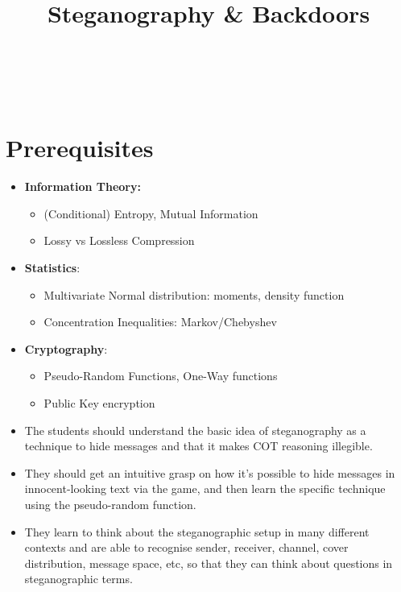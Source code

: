 \documentclass[11pt]{article}
\title{Steganography \& Backdoors}
\author{
  \authorname{Stephan Wäldchen}\\
  \affiliation{Independent}
  \and
  \authorname{Louis Jaburi}\\
  \affiliation{EleutherAI}
}
\date{}
\begin{document}
\maketitle

\section{Prerequisites}
\label{sec:prereqs}

\begin{itemize}
  \item \textbf{Information Theory:}
  \begin{itemize}
    \item (Conditional) Entropy, Mutual Information
    \item Lossy vs Lossless Compression
  \end{itemize}
  \item \textbf{Statistics}:
  \begin{itemize}
    \item Multivariate Normal distribution: moments, density function
    \item Concentration Inequalities: Markov/Chebyshev
  \end{itemize}
  \item \textbf{Cryptography}:
  \begin{itemize}
    \item Pseudo-Random Functions, One-Way functions
    \item Public Key encryption
  \end{itemize}
\end{itemize}

\begin{learningoutcomes}
\begin{itemize}
  \item The students should understand the basic idea of steganography as a
        technique to hide messages and that it makes COT reasoning illegible.
  \item They should get an intuitive grasp on how it's possible to hide
        messages in innocent-looking text via the game, and then learn the
        specific technique using the pseudo-random function.
  \item They learn to think about the steganographic setup in many different
        contexts and are able to recognise sender, receiver, channel, cover
        distribution, message space, etc, so that they can think about
        questions in steganographic terms.
\end{itemize}
\end{learningoutcomes}
\end{document}

